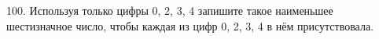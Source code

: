 100. Используя только цифры 0, 2, 3, 4 запишите такое наименьшее шестизначное число, чтобы каждая из цифр 0, 2, 3, 4 в нём присутствовала.\\
